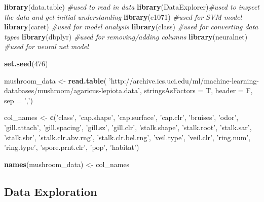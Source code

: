 \documentclass[
  english,
  man]{apa6}
\newenvironment{Shaded}{\begin{snugshade}}{\end{snugshade}}
\newcommand{\CommentTok}[1]{\textcolor[rgb]{0.56,0.35,0.01}{\textit{#1}}}
\newcommand{\DataTypeTok}[1]{\textcolor[rgb]{0.13,0.29,0.53}{#1}}
\newcommand{\DecValTok}[1]{\textcolor[rgb]{0.00,0.00,0.81}{#1}}
\newcommand{\KeywordTok}[1]{\textcolor[rgb]{0.13,0.29,0.53}{\textbf{#1}}}
\newcommand{\NormalTok}[1]{#1}
\newcommand{\StringTok}[1]{\textcolor[rgb]{0.31,0.60,0.02}{#1}}
\begin{document}
\begin{Shaded}
\begin{Highlighting}[]
\KeywordTok{library}\NormalTok{(data.table) }\CommentTok{#used to read in data}
\KeywordTok{library}\NormalTok{(DataExplorer)}\CommentTok{#used to inspect the data and get initial understanding}
\KeywordTok{library}\NormalTok{(e1071) }\CommentTok{#used for SVM model}
\KeywordTok{library}\NormalTok{(caret) }\CommentTok{#used for model analysis}
\KeywordTok{library}\NormalTok{(class) }\CommentTok{#used for converting data types}
\KeywordTok{library}\NormalTok{(dbplyr) }\CommentTok{#used for removing/adding columns}
\KeywordTok{library}\NormalTok{(neuralnet) }\CommentTok{#used for neural net model}

\KeywordTok{set.seed}\NormalTok{(}\DecValTok{476}\NormalTok{)}

\NormalTok{mushroom_data <-}\StringTok{ }\KeywordTok{read.table}\NormalTok{(}
  \StringTok{'http://archive.ics.uci.edu/ml/machine-learning-databases/mushroom/agaricus-lepiota.data'}\NormalTok{, }
  \DataTypeTok{stringsAsFactors =}\NormalTok{ T, }\DataTypeTok{header =}\NormalTok{ F, }\DataTypeTok{sep =} \StringTok{','}\NormalTok{)}

\NormalTok{col_names <-}\StringTok{ }\KeywordTok{c}\NormalTok{(}\StringTok{'class'}\NormalTok{, }\StringTok{'cap.shape'}\NormalTok{, }\StringTok{'cap.surface'}\NormalTok{, }\StringTok{'cap.clr'}\NormalTok{, }\StringTok{'bruises'}\NormalTok{, }\StringTok{'odor'}\NormalTok{,}
               \StringTok{'gill.attach'}\NormalTok{, }\StringTok{'gill.spacing'}\NormalTok{, }\StringTok{'gill.sz'}\NormalTok{, }\StringTok{'gill.clr'}\NormalTok{,}
               \StringTok{'stalk.shape'}\NormalTok{, }\StringTok{'stalk.root'}\NormalTok{, }\StringTok{'stalk.sar'}\NormalTok{, }\StringTok{'stalk.sbr'}\NormalTok{,}
               \StringTok{'stalk.clr.abv.rng'}\NormalTok{, }\StringTok{'stalk.clr.bel.rng'}\NormalTok{, }\StringTok{'veil.type'}\NormalTok{, }\StringTok{'veil.clr'}\NormalTok{,}
               \StringTok{'ring.num'}\NormalTok{, }\StringTok{'ring.type'}\NormalTok{, }\StringTok{'spore.prnt.clr'}\NormalTok{, }\StringTok{'pop'}\NormalTok{, }\StringTok{'habitat'}\NormalTok{)}

\KeywordTok{names}\NormalTok{(mushroom_data) <-}\StringTok{ }\NormalTok{col_names}
\end{Highlighting}
\end{Shaded}

\hypertarget{data-exploration}{%
\subsection{Data Exploration}\label{data-exploration}}
\end{document}
